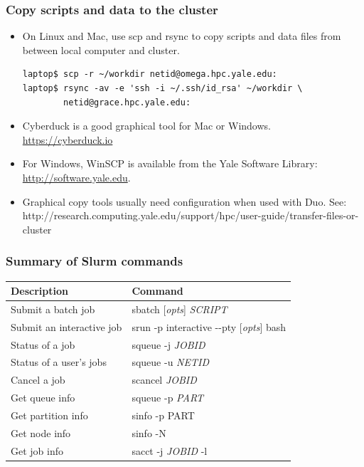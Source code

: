 \documentclass[10pt]{beamer}
\begin{document}

\begin{frame}[fragile]
\frametitle{Copy scripts and data to the cluster}
\begin{itemize}
\item On Linux and Mac, use scp and rsync
to copy scripts and data files from between local computer and cluster.

\begin{verbatim}
laptop$ scp -r ~/workdir netid@omega.hpc.yale.edu:
laptop$ rsync -av -e 'ssh -i ~/.ssh/id_rsa' ~/workdir \
        netid@grace.hpc.yale.edu:
\end{verbatim}

\item Cyberduck is a good graphical tool for Mac or Windows.  \url{https://cyberduck.io}

\item For Windows, WinSCP is available from the Yale Software
Library: \url{http://software.yale.edu}.

\item Graphical copy tools usually need configuration when used with Duo.  See:
http://research.computing.yale.edu/support/hpc/user-guide/transfer-files-or-cluster
\end{itemize}

\end{frame}

\begin{frame}
\frametitle{Summary of Slurm commands}
\begin{tabular}{|l|l|}
\hline
\textbf{Description} & \textbf{Command} \\
\hline
Submit a batch job & sbatch [\textit{opts}] \textit{SCRIPT} \\
\hline
Submit an interactive job & srun -p interactive -{}-pty [\textit{opts}] bash  \\
\hline
Status of a job & squeue -j \textit{JOBID} \\
\hline
Status of a user's jobs & squeue -u \textit{NETID} \\
\hline
Cancel a job & scancel \textit{JOBID} \\
\hline
Get queue info & squeue -p \textit{PART} \\
\hline
Get partition info & sinfo -p {PART} \\
\hline
Get node info & sinfo -N \\
\hline
Get job info & sacct -j \textit{JOBID} -l \\
\hline
\end{tabular}
\end{frame}
\end{document}
